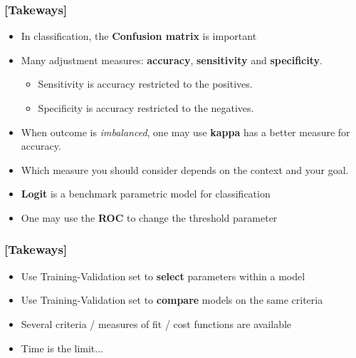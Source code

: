 \documentclass[xcolor=x11names,compress, handhouts]{beamer}
\renewcommand{\(}{\begin{columns}}
\renewcommand{\)}{\end{columns}}
\newcommand{\<}[1]{\begin{column}{#1}}
\renewcommand{\>}{\end{column}}
\begin{document}
\begin{frame} %
\frametitle{\textcolor{brique}{[Takeways]}}
\begin{itemize}[<+->]
  \item In classification, the \textbf{Confusion matrix} is important
 \item Many adjustment measures:  \textbf{accuracy}, \textbf{sensitivity} and \textbf{specificity}.
    \begin{itemize}[<+->]
      \item Sensitivity is accuracy restricted to the positives.
      \item Specificity is accuracy restricted to the negatives.
   \end{itemize}
 \item When  outcome is \textit{imbalanced}, one may use \textbf{kappa} has a better measure for accuracy.
  \item[] Which measure you should consider depends on the context and your goal.
 \item \textbf{Logit} is a benchmark parametric model for classification
 \item[] One may use the \textbf{ROC} to change the threshold parameter
\end{itemize}
\end{frame}


\begin{frame} %
\frametitle{\textcolor{brique}{[Takeways]}}
\begin{itemize}[<+->]
  \item Use Training-Validation set to \textbf{select} parameters within a model
  \item Use Training-Validation set to \textbf{compare} models on the same criteria
  \item Several criteria / measures of fit / cost functions are available
  \item Time is the limit...
\end{itemize}
\end{frame}


\end{document}
